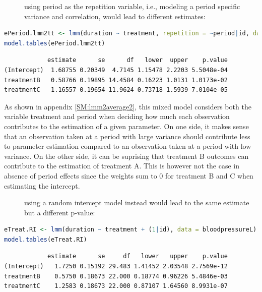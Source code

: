 \documentclass[12pt]{article}
\newcommand\Warning[1][3ex]{%
\renewcommand\stacktype{L}%
\scaleto{\stackon[1.3pt]{\color{red}$\triangle$}{\tiny\bfseries !}}{#1}%
\xspace
}
\begin{document}
\clearpage

\begin{description}
\item[{\Warning}] using period as the repetition variable, i.e., modeling a
period specific variance and correlation, would lead to different
estimates:
\end{description}
\begin{lstlisting}[language=r,numbers=none]
ePeriod.lmm2tt <- lmm(duration ~ treatment, repetition = ~period|id, data = bloodpressureL)
model.tables(ePeriod.lmm2tt)
\end{lstlisting}

\label{}
\begin{verbatim}
            estimate      se      df   lower  upper    p.value
(Intercept)  1.68755 0.20349  4.7145 1.15478 2.2203 5.5048e-04
treatmentB   0.58766 0.19895 14.4584 0.16223 1.0131 1.0173e-02
treatmentC   1.16557 0.19654 11.9624 0.73718 1.5939 7.0104e-05
\end{verbatim}


As shown in appendix \ref{SM:lmm2average2}, this mixed model considers both
the variable treatment and period when deciding how much each
observation contributes to the estimation of a given parameter. On one
side, it makes sense that an observation taken at a period with large
variance should contribute less to parameter estimation compared to an
observation taken at a period with low variance. On the other side, it
can be suprising that treatment B outcomes can contribute to the
estimation of treatment A. This is however not the case in absence of
period effects since the weights sum to 0 for treatment B and C when
estimating the intercept.

\begin{description}
\item[{\Warning}] using a random intercept model instead would lead to the
same estimate but a different p-value:
\end{description}
\begin{lstlisting}[language=r,numbers=none]
eTreat.RI <- lmm(duration ~ treatment + (1|id), data = bloodpressureL)
model.tables(eTreat.RI)
\end{lstlisting}

\label{}
\begin{verbatim}
            estimate      se     df   lower   upper    p.value
(Intercept)   1.7250 0.15192 29.483 1.41452 2.03548 2.7569e-12
treatmentB    0.5750 0.18673 22.000 0.18774 0.96226 5.4846e-03
treatmentC    1.2583 0.18673 22.000 0.87107 1.64560 8.9931e-07
\end{verbatim}
\end{document}
